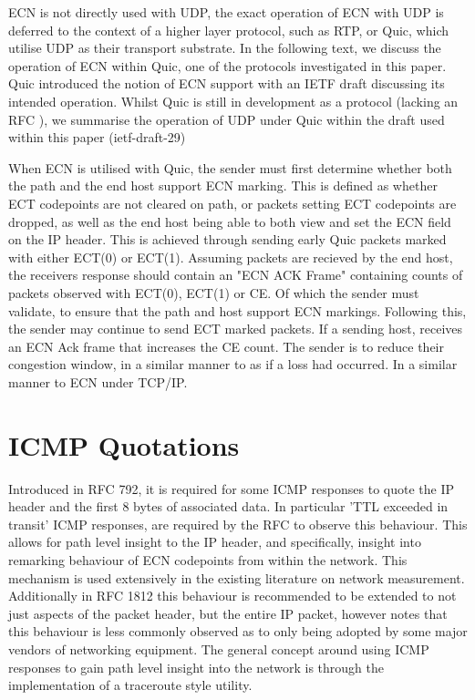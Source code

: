 \documentclass{l4proj}
\begin{document}
ECN is not directly used with UDP, the exact operation of ECN with UDP is deferred to the context of a higher layer protocol, such as RTP, or Quic, which utilise UDP as their transport substrate. In the following text, we discuss the operation of ECN within Quic, one of the protocols investigated in this paper. Quic introduced the notion of ECN support with an IETF draft \cite{johansson_ecn_2017} discussing its intended operation. Whilst Quic is still in development as a protocol (lacking an RFC ), we summarise the operation of UDP under Quic within the draft used within this paper (ietf-draft-29)

When ECN is utilised with Quic, the sender must first determine whether both the path and the end host support ECN marking. This is defined as whether ECT codepoints are not cleared on path, or packets setting ECT codepoints are dropped, as well as the end host being able to both view and set the ECN field on the IP header. This is achieved through sending early Quic packets marked with either ECT(0) or ECT(1). Assuming packets are recieved by the end host, the receivers response should contain an "ECN ACK Frame" containing counts of packets observed with ECT(0), ECT(1) or CE. Of which the sender must validate, to ensure that the path and host support ECN markings. Following this, the sender may continue to send ECT marked packets. If a sending host, receives an ECN Ack frame that increases the CE count. The sender is to reduce their congestion window, in a similar manner to as if a loss had occurred. In a similar manner to ECN under TCP/IP.

\section{ICMP Quotations}
\label{sec:icmp}

Introduced in RFC 792, it is required for some ICMP responses to quote the IP header and the first 8 bytes of associated data. In particular 'TTL exceeded in transit' ICMP responses, are required by the RFC to observe this behaviour. This allows for path level insight to the IP header, and specifically, insight into remarking behaviour of ECN codepoints from within the network. This mechanism is used extensively in the existing literature on network measurement. Additionally in RFC 1812 this behaviour is recommended to be extended to not just aspects of the packet header, but the entire IP packet, however \cite{noauthor_tracebox_nodate} notes that this behaviour is less commonly observed as to only being adopted by some major vendors of networking equipment. The general concept around using ICMP responses to gain path level insight into the network is through the implementation of a traceroute style utility. 
\end{document}
